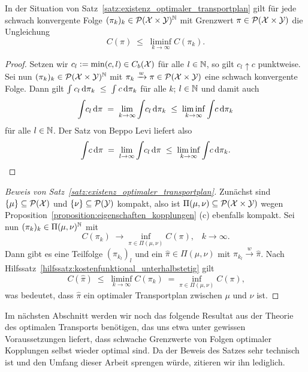 \documentclass[../thesis/thesis.tex]{subfiles}
\begin{document}
	\begin{Hilfssatz}
		\label{hilfssatz:kostenfunktional_unterhalbstetig}
		In der Situation von Satz~\ref{satz:existenz_optimaler_transportplan} gilt für jede schwach konvergente Folge $(\pi_k)_k \in \mathcal{P}(\mathcal{X} \times \mathcal{Y})^{\mathbb{N}}$ mit Grenzwert $\pi \in \mathcal{P}(\mathcal{X} \times \mathcal{Y})$ die Ungleichung
		\[ C(\pi) \; \leq \; \liminf_{k \to \infty} C(\pi_k) \text{.} \]
	\end{Hilfssatz}

	\begin{proof}
		Setzen wir $c_l \vcentcolon = \min(c, l) \in C_b(\mathcal{X})$ für alle $l \in \mathbb{N}$, so gilt $c_l \uparrow c$ punktweise. Sei nun $(\pi_k)_k \in \mathcal{P}(\mathcal{X} \times \mathcal{Y})^{\mathbb{N}}$ mit $\pi_k \xrightarrow{w} \pi \in \mathcal{P}(\mathcal{X} \times \mathcal{Y})$ eine schwach konvergente Folge. Dann gilt
		$\int_{} \, c_l \, \mathrm{d}\pi_k \; \leq \; \int_{} \, c \, \mathrm{d}\pi_k$ für alle $k$; $l \in \mathbb{N}$ und damit auch 
		\[ \int_{} \, c_l \, \mathrm{d}\pi \; = \; \lim_{k \to \infty} \int_{} \, c_l \, \mathrm{d}\pi_k \; \leq \; \liminf_{k \to \infty} \int_{} \, c \, \mathrm{d}\pi_k \]
		für alle $l \in \mathbb{N}$. Der Satz von Beppo Levi liefert also
		\[ \int_{} \, c \, \mathrm{d}\pi \; = \; \lim_{l \to \infty} \int_{} \, c_l \, \mathrm{d}\pi \; \leq \; \liminf_{k \to \infty} \int_{} \, c \, \mathrm{d}\pi_k \text{.} \qedhere \]
	\end{proof}

	\begin{proof}[Beweis von Satz~\ref{satz:existenz_optimaler_transportplan}]
		Zunächst sind $\left\{\mu\right\} \subseteq \mathcal{P}(\mathcal{X})$ und $\left\{\nu\right\} \subseteq \mathcal{P}(\mathcal{Y})$ kompakt, also ist $\Pi(\mu, \nu) \subseteq \mathcal{P}(\mathcal{X} \times \mathcal{Y})$ 
		wegen Proposition~\ref{proposition:eigenschaften_kopplungen} (c) ebenfalls kompakt.
		Sei nun $(\pi_k)_k \in \Pi(\mu, \nu)^{\mathbb{N}}$ mit
		\[ C(\pi_k) \; \to \inf_{\pi \in \Pi(\mu, \nu)} C(\pi) \text{,} \quad k \to \infty \text{.} \]
		Dann gibt es eine Teilfolge $(\pi_{k_l})_l$ und ein $\hat{\pi} \in \Pi(\mu, \nu)$ mit $\pi_{k_l} \xrightarrow{w} \hat{\pi}$. Nach Hilfssatz~\ref{hilfssatz:kostenfunktional_unterhalbstetig} gilt
		\[ C(\hat{\pi}) \; \leq \; \liminf_{k \to \infty} C(\pi_k) \; = \inf_{\pi \in \Pi(\mu, \nu)} C(\pi) \text{,} \]
		was bedeutet, dass $\hat{\pi}$ ein optimaler Transportplan zwischen $\mu$ und $\nu$ ist. 
	\end{proof}

	Im nächsten Abschnitt werden wir noch das folgende Resultat aus der Theorie des optimalen Transports benötigen, das uns etwa unter gewissen Voraussetzungen liefert, dass schwache Grenzwerte von Folgen optimaler
	Kopplungen selbst wieder optimal sind. Da der Beweis des Satzes sehr technisch ist und den Umfang dieser Arbeit sprengen würde, zitieren wir ihn lediglich.
\end{document}
